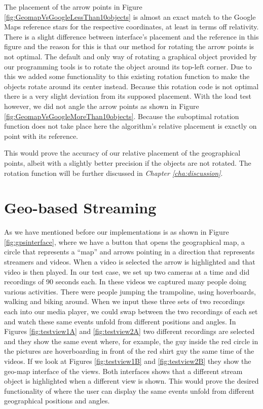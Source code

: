 The placement of the arrow points in Figure \ref{fig:GeomapVsGoogleLessThan10objects} is almost an exact match to the Google Maps reference stars for the respective coordinates, at least in terms off relativity. There is a slight difference between interface's placement and the reference in this figure and the reason for this is that our method for rotating the arrow points is not optimal. The default and only way of rotating a graphical object provided by our programming tools is to rotate the object around its top-left corner. Due to this we added some functionality to this existing rotation function to make the objects rotate around its center instead. Because this rotation code is not optimal there is a very slight deviation from its supposed placement. With the load test however, we did not angle the arrow points as shown in Figure \ref{fig:GeomapVsGoogleMoreThan10objects}. Because the suboptimal rotation function does not take place here the algorithm's relative placement is exactly on point with its reference.

This would prove the accuracy of our relative placement of the geographical points, albeit with a slightly better precision if the objects are not rotated. The rotation function will be further discussed in \textit{Chapter \ref{cha:discussion}}.

\section{Geo-based Streaming}
\label{sec:geobasedstreaming}

As we have mentioned before our implementations is as shown in Figure \ref{fig:gpsinterface}, where we have a button that opens the geographical map, a circle that represents a “map” and arrows pointing in a direction that represents streamers and videos. When a video is selected the arrow is highlighted and that video is then played. In our test case, we set up two cameras at a time and did recordings of 90 seconds each. In these videos we captured many people doing various activities. There were people jumping the trampoline, using hoverboards, walking and biking around. When we input these three sets of two recordings each into our media player, we could swap between the two recordings of each set and watch these same events unfold from different positions and angles. In Figures \ref{fig:testview1A} and \ref{fig:testview2A} two different recordings are selected and they show the same event where, for example, the guy inside the red circle in the pictures are hoverboarding in front of the red shirt guy the same time of the videos. If we look at Figures \ref{fig:testview1B} and \ref{fig:testview2B} they show the geo-map interface of the views. Both interfaces shows that a different stream object is highlighted when a different view is shown. This would prove the desired functionality of where the user can display the same events unfold from different geographical positions and angles.

